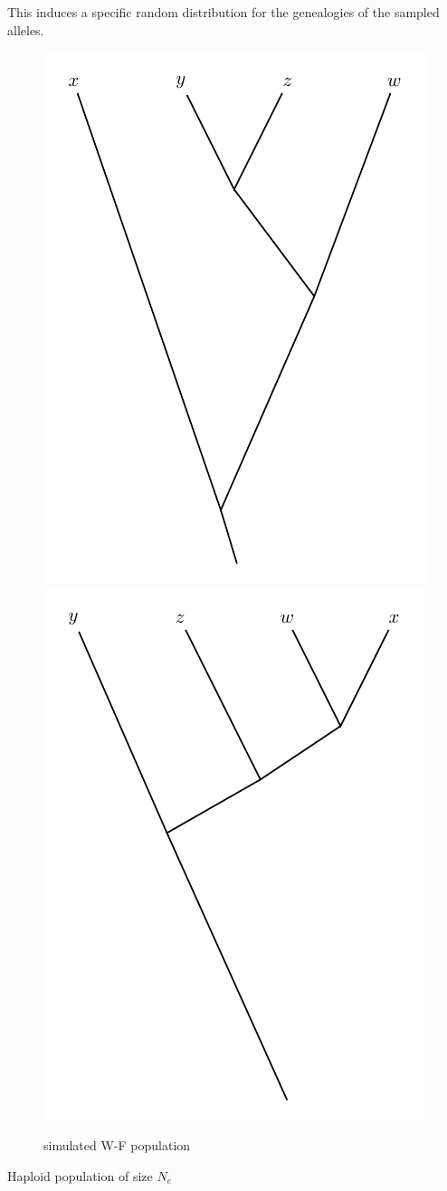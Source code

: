 \documentclass[12pt]{book}
\begin{document}
        This induces a specific random distribution for the genealogies of the sampled alleles.

        \begin{figure}[htbp]
            \centering
            \includegraphics[scale = 0.8]{fig/W-F_result_123.pdf}
            \includegraphics[scale = 0.8]{fig/W-F_result_888.pdf}
            \caption{simulated W-F population}
        \end{figure}
        
        Haploid population of size $N_e$


\ifx\allfiles\undefined
\end{document}
